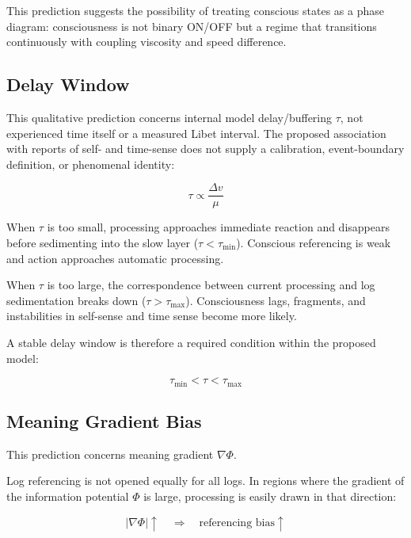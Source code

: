 This prediction suggests the possibility of treating conscious states as a phase diagram: consciousness is not binary ON/OFF but a regime that transitions continuously with coupling viscosity and speed difference.

\subsection{Delay Window}


This qualitative prediction concerns internal model delay/buffering $\tau$, not experienced time itself or a measured Libet interval. The proposed association with reports of self- and time-sense does not supply a calibration, event-boundary definition, or phenomenal identity:

\begin{equation}
\tau \propto \frac{\Delta v}{\mu}
\end{equation}

When $\tau$ is too small, processing approaches immediate reaction and disappears before sedimenting into the slow layer ($\tau < \tau_{\min}$). Conscious referencing is weak and action approaches automatic processing.

When $\tau$ is too large, the correspondence between current processing and log sedimentation breaks down ($\tau > \tau_{\max}$). Consciousness lags, fragments, and instabilities in self-sense and time sense become more likely.

A stable delay window is therefore a required condition within the proposed model:

\begin{equation}
\tau_{\min} < \tau < \tau_{\max}
\end{equation}

\subsection{Meaning Gradient Bias}


This prediction concerns meaning gradient $\nabla\Phi$.

Log referencing is not opened equally for all logs. In regions where the gradient of the information potential $\Phi$ is large, processing is easily drawn in that direction:

\begin{equation}
|\nabla \Phi| \uparrow \quad \Rightarrow \quad \text{referencing bias} \uparrow
\end{equation}


